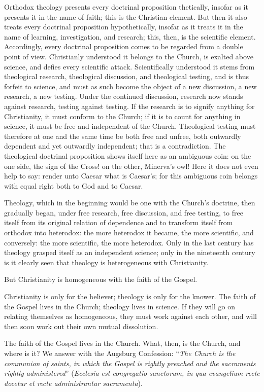 \documentclass[12pt,a4paper]{book}
\begin{document}
Orthodox theology presents every doctrinal proposition thetically, insofar as
it presents it in the name of faith; this is the Christian element. But then it
also treats every doctrinal proposition hypothetically, insofar as it treats it
in the name of learning, investigation, and research; this, then, is the
scientific element. Accordingly, every doctrinal proposition comes to be
regarded from a double point of view. Christianly understood it belongs to the
Church, is exalted above science, and defies every scientific attack.
Scientifically understood it stems from theological research, theological
discussion, and theological testing, and is thus forfeit to science, and must
as such become the object of a new discussion, a new research, a new testing.
Under the continued discussion, research now stands against research, testing
against testing. If the research is to signify anything for Christianity, it
must conform to the Church; if it is to count for anything in science, it must
be free and independent of the Church. Theological testing must therefore at
one and the same time be both free and unfree, both outwardly dependent and yet
outwardly independent; that is a contradiction. The theological doctrinal
proposition shows itself here as an ambiguous coin: on the one side, the sign
of the Cross! on the other, Minerva's owl! Here it does not even help to say:
render unto Caesar what is Caesar's; for this ambiguous coin belongs with equal
right both to God and to Caesar.

Theology, which in the beginning would be one with the Church's doctrine, then
gradually began, under free research, free discussion, and free testing, to
free itself from its original relation of dependence and to transform itself
from orthodox into heterodox: the more heterodox it became, the more
scientific, and conversely: the more scientific, the more heterodox. Only
in the last century has theology grasped itself as an independent science; only
in the nineteenth century is it clearly seen that theology is heterogeneous
with Christianity.

But Christianity is homogeneous with the faith of the Gospel.

Christianity is only for the believer; theology is only for the knower. The
faith of the Gospel lives in the Church; theology lives in science. If they
will go on relating themselves as homogeneous, they must work against each
other, and will then soon work out their own mutual dissolution.

The faith of the Gospel lives in the Church. What, then, is the Church, and
where is it? We answer with the Augsburg Confession: ``\emph{The Church is the
communion of saints, in which the Gospel is rightly preached and the sacraments
rightly administered}'' (\textit{Ecclesia est congregatio sanctorum, in qua
evangelium recte docetur et recte administrantur sacramenta}).
\end{document}
